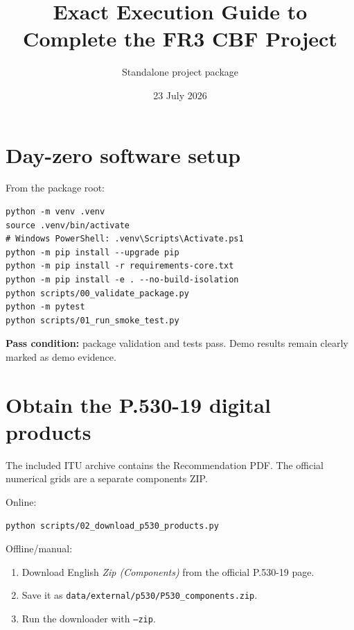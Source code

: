 \documentclass[11pt]{article}
\title{\textbf{Exact Execution Guide to Complete the FR3 CBF Project}}
\author{Standalone project package}
\date{23 July 2026}
\begin{document}
\maketitle

\begin{center}
\end{center}

\section{Day-zero software setup}

From the package root:
\begin{verbatim}
python -m venv .venv
source .venv/bin/activate
# Windows PowerShell: .venv\Scripts\Activate.ps1
python -m pip install --upgrade pip
python -m pip install -r requirements-core.txt
python -m pip install -e . --no-build-isolation
python scripts/00_validate_package.py
python -m pytest
python scripts/01_run_smoke_test.py
\end{verbatim}

\textbf{Pass condition:} package validation and tests pass. Demo results remain clearly marked as demo evidence.

\section{Obtain the P.530-19 digital products}

The included ITU archive contains the Recommendation PDF. The official numerical grids are a separate components ZIP.

Online:
\begin{verbatim}
python scripts/02_download_p530_products.py
\end{verbatim}

Offline/manual:
\begin{enumerate}
\item Download English \emph{Zip (Components)} from the official P.530-19 page.
\item Save it as \texttt{data/external/p530/P530\_components.zip}.
\item Run the downloader with \texttt{--zip}.
\end{enumerate}
\end{document}
